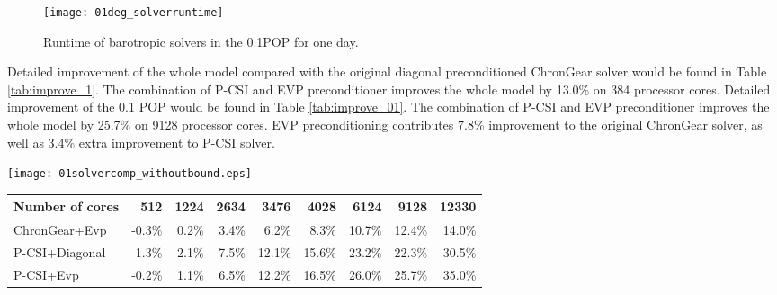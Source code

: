 \begin {figure}[!t]
\centering
\texttt{[image: 01deg\_solverruntime]}
\caption []{Runtime of barotropic solvers in the 0.1\degree POP for one day.\label {fig:runtime01}}
\end {figure}
Detailed improvement of the whole model compared with the original diagonal preconditioned ChronGear solver would be found in Table \ref{tab:improve_1}. The combination of P-CSI and EVP preconditioner improves the whole model by 13.0\% on 384 processor cores. 
Detailed improvement of the 0.1 \degree POP  would be found in Table \ref{tab:improve_01}. 
The combination of P-CSI and EVP preconditioner improves the whole model by 25.7\% on 9128 processor cores. 
EVP preconditioning contributes 7.8\% improvement to the original ChronGear solver, as well as 3.4\% extra improvement to P-CSI solver. 



\begin{figure*}[!t]
\begin{center}
	\texttt{[image: 01solvercomp\_withoutbound.eps]}
\end{center}
\caption[] {Time components of barotropic solvers in 0.1\degree POP. Four kinds of solvers are ChronGear or P-CSI with a diagonal preconditioner or an EVP preconditioner. (a) Execution time of global reduction, (b) Execution time of boundary communication, (c) Execution time of computing. }
\label{fig:component}
\end{figure*}

\begin{table*}
\centering
\caption {Percentage of improvement of the total execution time in 0.1\degree POP. \label{tab:improve_01}}
\begin{tabular}{|l|r|r|r|r|r|r|r|r|}
\hline
Number of cores & 512  & 1224   & 2634 & 3476 & 4028 & 6124 & 9128 & 12330\\
\hline
ChronGear+Evp &-0.3\% &0.2\%&3.4\%  & 6.2\%& 8.3\% & 10.7\%& 12.4\% & 14.0\%\\\hline
P-CSI+Diagonal  & 1.3\% & 2.1\%	&7.5\%  &12.1\% &15.6\% &23.2\% &22.3\% &30.5\%\\\hline
P-CSI+Evp	      &-0.2\% & 1.1\%&6.5\%  &12.2\% &16.5\% &26.0\% &25.7\% &35.0\%\\
\hline
\end{tabular}
\end{table*}

